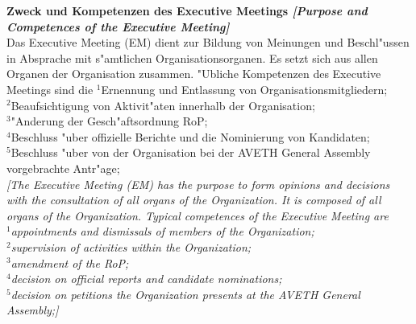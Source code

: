 \documentclass[10pt]{article}
\newcounter{qcounter}
\begin{document}
\begin{list}{{\bf Artikel :~}}{}
\item {\bf Zweck und Kompetenzen des Executive Meetings {\it[Purpose and Competences of the Executive Meeting]}}\label{EM}\\
Das Executive Meeting (EM) dient zur Bildung von Meinungen und Beschl"ussen in Absprache mit s"amtlichen Organisationsorganen. Es setzt sich aus allen Organen der Organisation zusammen. "Ubliche Kompetenzen des Executive Meetings sind die
$^{1}$Ernennung und Entlassung von Organisationsmitgliedern;\\
$^{2}$Beaufsichtigung von Aktivit"aten innerhalb der Organisation;\\
$^{3}$"Anderung der Gesch"aftsordnung RoP;\\
$^{4}$Beschluss "uber offizielle Berichte und die Nominierung von Kandidaten;\\
$^{5}$Beschluss "uber von der Organisation bei der AVETH General Assembly vorgebrachte Antr"age;\\
{\it[The Executive Meeting (EM) has the purpose to form opinions and decisions with the consultation of all organs of the Organization. It is composed of all organs of the Organization. Typical competences of the Executive Meeting are\\
$^{1}$appointments and dismissals of members of the Organization;\\
$^{2}$supervision of activities within the Organization;\\
$^{3}$amendment of the RoP;\\
$^{4}$decision on official reports and candidate nominations;\\
$^{5}$decision on petitions the Organization presents at the AVETH General Assembly;]}


\end{list}
\end{document}
